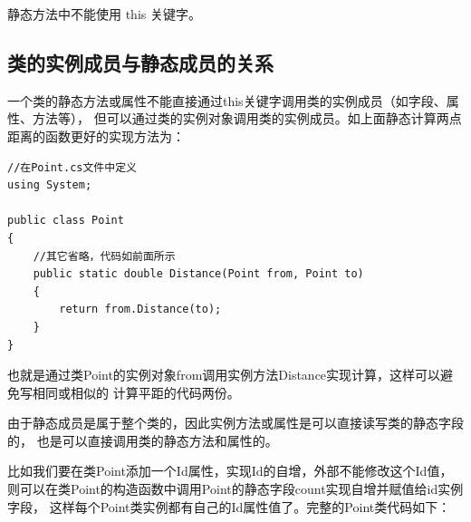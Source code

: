 静态方法中不能使用 this 关键字。


\subsection{类的实例成员与静态成员的关系}

一个类的静态方法或属性不能直接通过this关键字调用类的实例成员（如字段、属性、方法等），
但可以通过类的实例对象调用类的实例成员。如上面静态计算两点距离的函数更好的实现方法为：

\begin{lstlisting}
//在Point.cs文件中定义
using System;

public class Point
{ 
    //其它省略，代码如前面所示
    public static double Distance(Point from, Point to)
    {      
        return from.Distance(to);
    }
}
\end{lstlisting}

也就是通过类Point的实例对象from调用实例方法Distance实现计算，这样可以避免写相同或相似的
计算平距的代码两份。

由于静态成员是属于整个类的，因此实例方法或属性是可以直接读写类的静态字段的，
也是可以直接调用类的静态方法和属性的。

比如我们要在类Point添加一个Id属性，实现Id的自增，外部不能修改这个Id值，
则可以在类Point的构造函数中调用Point的静态字段count实现自增并赋值给id实例字段，
这样每个Point类实例都有自己的Id属性值了。完整的Point类代码如下：

